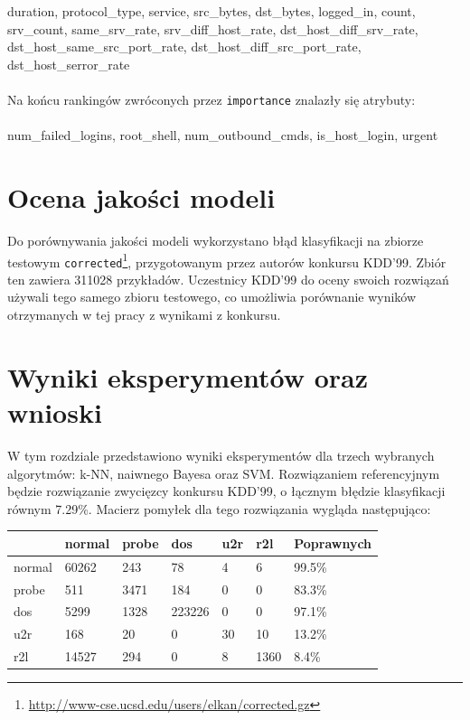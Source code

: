 \documentclass[a4paper, 12pt]{article}
\begin{document}
duration, protocol\_type, service, src\_bytes, dst\_bytes, logged\_in, count, srv\_count,
same\_srv\_rate, 
srv\_diff\_host\_rate, 
dst\_host\_diff\_srv\_rate, 
dst\_host\_same\_src\_port\_rate,
dst\_host\_diff\_src\_port\_rate, 
dst\_host\_serror\_rate 
\\\\
Na końcu rankingów zwróconych przez \texttt{importance} znalazły się atrybuty:
\\\\
num\_failed\_logins, root\_shell, num\_outbound\_cmds, is\_host\_login, urgent   

\section{Ocena jakości modeli}

Do porównywania jakości modeli wykorzystano błąd klasyfikacji na zbiorze testowym 
\texttt{corrected}\footnote{\url{http://www-cse.ucsd.edu/users/elkan/corrected.gz}},
przygotowanym przez autorów konkursu KDD'99.
Zbiór ten zawiera 311028 przykładów. 
Uczestnicy KDD'99 do oceny swoich rozwiązań używali tego samego zbioru testowego,
co umożliwia porównanie wyników otrzymanych w tej pracy z wynikami z konkursu.

\section{Wyniki eksperymentów oraz wnioski}
\label{sec:wyniki}

W tym rozdziale przedstawiono wyniki eksperymentów dla trzech wybranych algorytmów:
k-NN, naiwnego Bayesa oraz SVM. 
Rozwiązaniem referencyjnym będzie rozwiązanie zwycięzcy konkursu KDD'99,
o łącznym błędzie klasyfikacji równym 7.29\%. Macierz pomyłek dla 
tego rozwiązania wygląda następująco:

\begin{table}[H]
\centering
\begin{tabular}{ | l | l | l | l | l | l | l | } \hline
	& normal & probe & dos 	& u2r 	& r2l 	& Poprawnych	\\ \hline
normal 	& 60262 & 243 	& 78	& 4	& 6 	& 99.5\% 	\\ \hline
probe 	& 511 	& 3471 	& 184	& 0	& 0 	& 83.3\% 	\\ \hline
dos 	& 5299 	& 1328 	& 223226& 0 	& 0 	& 97.1\% 	\\ \hline
u2r 	& 168 	& 20 	& 0	& 30	& 10	& 13.2\%	\\ \hline
r2l 	& 14527 & 294 	& 0	& 8	& 1360	& 8.4\%		\\ \hline
\end{tabular} 
\end{table}
\end{document}
